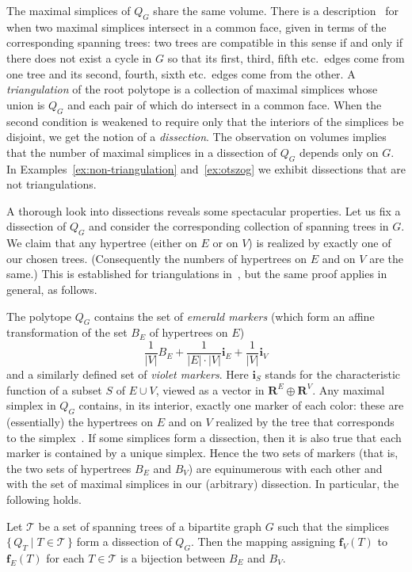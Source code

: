 \documentclass[ALCO,ThmDefs,Unicode,epreuves]{cedram}
\newcommand{\R}{\mathbf{R}}
\begin{document}
The maximal simplices of $Q_G$ share the same volume. There is a description~\cite[Lemma~12.6]{alex} for when two maximal simplices intersect in a common face, given in terms of the corresponding spanning trees: two trees are compatible in this sense if and only if there does not exist a cycle in $G$ so that its first, third, fifth etc.\ edges come from one tree and its second, fourth, sixth etc.\ edges come from the other. A \emph{triangulation} of the root polytope is a collection of maximal simplices whose union is $Q_G$ and each pair of which do intersect in a common face. When the second condition is weakened to require only that the interiors of the simplices be disjoint, we get the notion of a \emph{dissection}. The observation on volumes implies that the number of maximal simplices in a dissection of $Q_G$ depends only on $G$. In Examples~\ref{ex:non-triangulation} and~\ref{ex:otszog} we exhibit dissections that are not triangulations.

A thorough look into dissections reveals some spectacular properties. Let us fix a dissection of $Q_G$ and consider the corresponding collection of spanning trees in $G$. We claim that any hypertree (either on $E$ or on $V$) is realized by exactly one of our chosen trees. (Consequently the numbers of hypertrees on $E$ and on $V$ are the same.) This is established for triangulations in~\cite{alex}, but the same proof applies in general, as follows. 

The polytope $Q_G$ contains the set of \emph{emerald markers} (which form an affine transformation of the set $B_E$ of hypertrees on $E$)
\[\frac1{|V|}B_E+\frac1{|E|\cdot|V|}\mathbf i_E+\frac1{|V|}\mathbf i_V\]
and a similarly defined set of \emph{violet markers}. Here $\mathbf i_S$ stands for the characteristic function of a subset $S$ of $E\cup V$, viewed as a vector in $\R^E\oplus\R^V$. Any maximal simplex in $Q_G$ contains, in its interior, exactly one marker of each color: these are (essentially) the hypertrees on $E$ and on $V$ realized by the tree that corresponds to the simplex~\cite[Lemma~14.9]{alex}. If some simplices form a dissection, then it is also true that each marker is contained by a unique simplex. Hence the two sets of markers (that is, the two sets of hypertrees $B_E$ and $B_V$) are equinumerous with each other and with the set of maximal simplices in our (arbitrary) dissection. In particular, the following holds.

\begin{theo}
\label{l:quasitriang_gives_bijection}
Let $\mathcal{T}$ be a set of spanning trees of a bipartite graph $G$ such that the simplices $\{\,Q_T\mid T\in\mathcal{T}\,\}$ form a dissection of $Q_G$. Then the mapping assigning $\mathbf f_V(T)$ to $\mathbf f_E(T)$ for each $T\in\mathcal{T}$ is a bijection between $B_E$ and $B_V$.
\end{theo}
\end{document}
